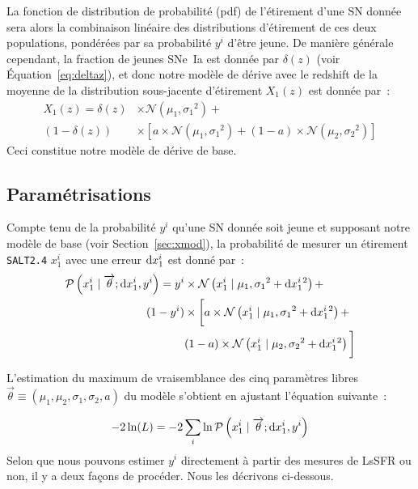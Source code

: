 \documentclass[../main/main.tex]{subfiles}
\begin{document}
La fonction de distribution de probabilité (pdf) de l'étirement d'une SN donnée
sera alors la combinaison linéaire des distributions d'étirement de ces deux
populations, pondérées par sa probabilité $y^i$ d'être jeune. De manière
générale cependant, la fraction de jeunes SNe~Ia est donnée par $\delta(z)$
(voir Équation~\ref{eq:deltaz}), et donc notre modèle de dérive avec le redshift
de la moyenne de la distribution sous-jacente d'étirement $X_1(z)$ est donnée
par~:
\begin{align}\label{eq:stretchz}
    X_1(z) = \delta(z)&\times \mathcal{N}(\mu_1,\sigma_1{}^2) + \nonumber \\
    (1-\delta(z))&\times \left[ a\times\mathcal{N}(\mu_1,\sigma_1{}^2) +
    (1-a)\times\mathcal{N}(\mu_2,\sigma_2{}^2) \right]
\end{align}
Ceci constitue notre modèle de dérive de base.

\subsection{Paramétrisations}\label{ssec:pmod}

Compte tenu de la probabilité $y^i$ qu'une SN donnée soit jeune et supposant
notre modèle de base (voir Section~\ref{sec:xmod}), la probabilité de
mesurer un étirement \texttt{SALT2.4} $x_1^i$ avec une erreur $\mathrm{d} x_1^i$ est
donné par~:
\begin{align}\label{eq:likelihoodsnf}
    \mathcal{P}\left(x^i_1 \mid \overrightarrow{\theta}; \mathrm{d}x^i_1, y^i\right) =
    y^i & \times
    \mathcal{N}\left(x^i_1 \mid \mu_1, \sigma_1{}^2+\mathrm{d}x^i_1{}^2\right) +
    \nonumber\\
    (1-y^i) &\times \bigg[
    a \times \mathcal{N}\left(x^i_1 \mid \mu_1,
    \sigma_1{}^2+\mathrm{d}x^i_1{}^2\right) +
    \nonumber\\
    & (1-a) \times \mathcal{N}\left(x^i_1 \mid \mu_2,
    \sigma_2{}^{2}+\mathrm{d}x^i_1{}^2\right) \bigg]
\end{align}

L'estimation du maximum de vraisemblance des cinq paramètres libres
$\overrightarrow{\theta}\equiv({\mu_1, \mu_2, \sigma_1, \sigma_2,a})$ du modèle
s'obtient en ajustant l'équation suivante~:

\begin{equation}\label{eq:likelihood}
    -2\ln(L) = -2 \sum_i \ln \mathcal{P}\left(x_1^i \mid \overrightarrow{\theta};
    \mathrm{d}x_1^i, y^i\right)
\end{equation}
Selon que nous pouvons estimer $y^i$ directement à partir des mesures de LsSFR
ou non, il y a deux façons de procéder. Nous les décrivons ci-dessous.
\end{document}
